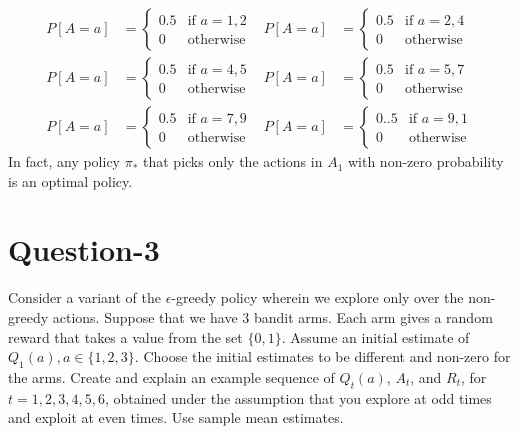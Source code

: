 \documentclass[11pt]{article}
\begin{document}
    \begin{align*}
        P[A = a] &= \begin{cases} 0.5 & \text{if } a = 1, 2 \\ 0 & \text{otherwise} \end{cases}
        &P[A = a] &= \begin{cases} 0.5 & \text{if } a = 2, 4 \\ 0 & \text{otherwise} \end{cases} \\
        P[A = a] &= \begin{cases} 0.5 & \text{if } a = 4, 5 \\ 0 & \text{otherwise} \end{cases}
        &P[A = a] &= \begin{cases} 0.5 & \text{if } a = 5, 7 \\ 0 & \text{otherwise} \end{cases} \\
        P[A = a] &= \begin{cases} 0.5 & \text{if } a = 7, 9 \\ 0 & \text{otherwise} \end{cases}
        &P[A = a] &= \begin{cases} 0..5 & \text{if } a = 9, 1 \\ 0 & \text{otherwise} \end{cases}
    \end{align*}
    In fact, any policy $\pi_{*}$ that picks only the actions in $A_{1}$ with non-zero probability
    is an optimal policy.

    \section*{Question-3}
    Consider a variant of the $\epsilon$-greedy policy wherein we explore only over the non-greedy
    actions. Suppose that we have 3 bandit arms. Each arm gives a random reward that takes a value
    from the set $\{ 0, 1 \}$. Assume an initial estimate of $Q_{1}(a), a \in \{ 1, 2, 3 \}$. Choose
    the initial estimates to be different and non-zero for the arms. Create and explain an example
    sequence of $Q_{t}(a)$, $A_{t}$, and $R_{t}$, for $t = 1, 2, 3, 4, 5, 6$, obtained under the assumption
    that you explore at odd times and exploit at even times. Use sample mean estimates.
\end{document}
